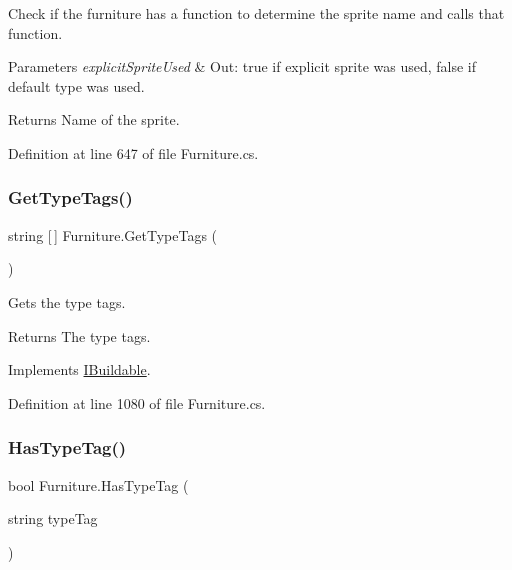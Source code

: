 Check if the furniture has a function to determine the sprite name and calls that function. 


\begin{DoxyParams}{Parameters}
{\em explicit\+Sprite\+Used} & Out\+: true if explicit sprite was used, false if default type was used.\\
\hline
\end{DoxyParams}
\begin{DoxyReturn}{Returns}
Name of the sprite.
\end{DoxyReturn}


Definition at line 647 of file Furniture.\+cs.

\mbox{\label{class_furniture_aca7ba6acd54e3969018a2f8848dc2632}} 
\subsubsection{\texorpdfstring{Get\+Type\+Tags()}{GetTypeTags()}}
{\footnotesize\ttfamily string \mbox{[}$\,$\mbox{]} Furniture.\+Get\+Type\+Tags (\begin{DoxyParamCaption}{ }\end{DoxyParamCaption})}



Gets the type tags. 

\begin{DoxyReturn}{Returns}
The type tags.
\end{DoxyReturn}


Implements \hyperlink{interface_i_buildable_ab1f899fc1d9ece21b46612d6119f744d}{I\+Buildable}.



Definition at line 1080 of file Furniture.\+cs.

\mbox{\label{class_furniture_ac7197b3778cafab778581d936d2b5983}} 
\subsubsection{\texorpdfstring{Has\+Type\+Tag()}{HasTypeTag()}}
{\footnotesize\ttfamily bool Furniture.\+Has\+Type\+Tag (\begin{DoxyParamCaption}\item[{string}]{type\+Tag }\end{DoxyParamCaption})}



